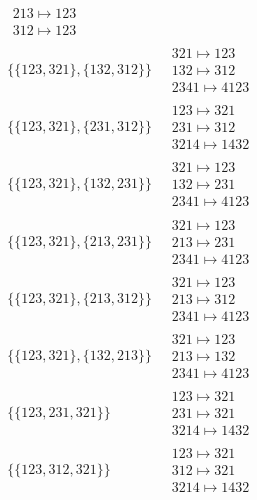 \begin{scriptsize}
\begin{align}
\begin{matrix}
213 \mapsto 123\\312 \mapsto 123
\end{matrix}
\\
\{\{123, 321\}, \{132, 312\}\}
\ 
&
\begin{matrix}
321 \mapsto 123\\132 \mapsto 312\\2341 \mapsto 4123
\end{matrix}
\\
\{\{123, 321\}, \{231, 312\}\}
\ 
&
\begin{matrix}
123 \mapsto 321\\231 \mapsto 312\\3214 \mapsto 1432
\end{matrix}
\\
\{\{123, 321\}, \{132, 231\}\}
\ 
&
\begin{matrix}
321 \mapsto 123\\132 \mapsto 231\\2341 \mapsto 4123
\end{matrix}
\\
\{\{123, 321\}, \{213, 231\}\}
\ 
&
\begin{matrix}
321 \mapsto 123\\213 \mapsto 231\\2341 \mapsto 4123
\end{matrix}
\\
\{\{123, 321\}, \{213, 312\}\}
\ 
&
\begin{matrix}
321 \mapsto 123\\213 \mapsto 312\\2341 \mapsto 4123
\end{matrix}
\\
\{\{123, 321\}, \{132, 213\}\}
\ 
&
\begin{matrix}
321 \mapsto 123\\213 \mapsto 132\\2341 \mapsto 4123
\end{matrix}
\\
\{\{123, 231, 321\}\}
\ 
&
\begin{matrix}
123 \mapsto 321\\231 \mapsto 321\\3214 \mapsto 1432
\end{matrix}
\\
\{\{123, 312, 321\}\}
\ 
&
\begin{matrix}
123 \mapsto 321\\312 \mapsto 321\\3214 \mapsto 1432

\end{matrix}
\end{align}
\end{scriptsize}

